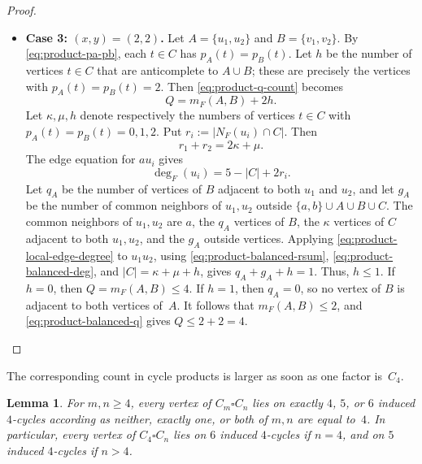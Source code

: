 \documentclass[a4paper]{article}
\theoremstyle{plain}
\newtheorem{lemma}[lemma]{Lemma}
\theoremstyle{definition}
\numberwithin{equation}{section}
\begin{document}
\begin{proof}
\begin{itemize}
\item \textbf{Case 3: $(x,y)=(2,2)$.}
Let $A=\{u_1,u_2\}$ and $B=\{v_1,v_2\}$.
By \eqref{eq:product-pa-pb}, each $t\in C$ has $p_A(t)=p_B(t)$.
Let $h$ be the number of vertices $t\in C$ that are anticomplete to $A\cup B$; these are precisely the vertices with $p_A(t)=p_B(t)=2$.
Then \eqref{eq:product-q-count} becomes
\begin{equation}
\label{eq:product-balanced-q}
Q=m_F(A,B)+2h.
\end{equation}
Let $\kappa,\mu,h$ denote respectively the numbers of vertices $t\in C$ with $p_A(t)=p_B(t)=0,1,2$.
Put $r_i:=|N_F(u_i)\cap C|$.
Then
\begin{equation}
\label{eq:product-balanced-rsum}
r_1+r_2=2\kappa+\mu.
\end{equation}
The edge equation for $au_i$ gives
\begin{equation}
\label{eq:product-balanced-deg}
\deg_F(u_i)=5-|C|+2r_i.
\end{equation}
Let $q_A$ be the number of vertices of $B$ adjacent to both $u_1$ and $u_2$, and let $g_A$ be the number of common neighbors of $u_1,u_2$ outside $\{a,b\}\cup A\cup B\cup C$.
The common neighbors of $u_1,u_2$ are $a$, the $q_A$ vertices of $B$, the $\kappa$ vertices of $C$ adjacent to both $u_1,u_2$, and the $g_A$ outside vertices.
Applying \eqref{eq:product-local-edge-degree} to $u_1u_2$, using \eqref{eq:product-balanced-rsum}, \eqref{eq:product-balanced-deg}, and $|C|=\kappa+\mu+h$, gives $q_A+g_A+h=1$.
Thus, $h\le 1$.
If $h=0$, then $Q=m_F(A,B)\le 4$.
If $h=1$, then $q_A=0$, so no vertex of $B$ is adjacent to both vertices of~$A$.
It follows that $m_F(A,B)\le 2$, and \eqref{eq:product-balanced-q} gives $Q\le 2+2=4$.
\end{itemize}
\end{proof}

The corresponding count in cycle products is larger as soon as one factor is~$C_4$.

\begin{lemma}
\label{lem:cycle-product-local-c4-count}
For $m,n\ge 4$, every vertex of $C_m\square C_n$ lies on exactly $4$, $5$, or $6$ induced $4$-cycles according as neither, exactly one, or both of $m,n$ are equal to~$4$.
In particular, every vertex of $C_4\square C_n$ lies on $6$ induced $4$-cycles if $n=4$, and on $5$ induced $4$-cycles if $n>4$.
\end{lemma}
\end{document}

